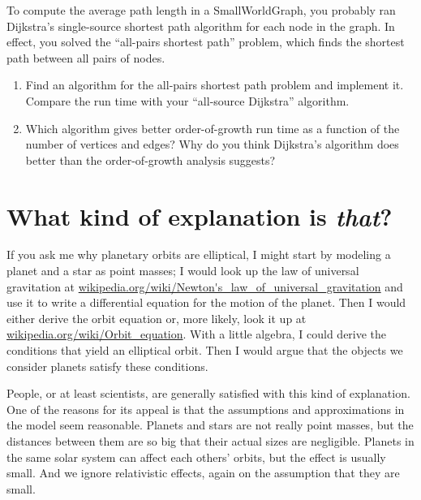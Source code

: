 \documentclass[10pt]{book}
\begin{document}
\begin{exercise}

To compute the average path length in a SmallWorldGraph, you
probably ran Dijkstra's single-source shortest path algorithm
for each node in the graph.  In effect, you solved the
``all-pairs shortest path'' problem, which finds the shortest path
between all pairs of nodes.

\begin{enumerate}

\item Find an algorithm for the all-pairs shortest path problem
and implement it.  Compare the run time with your
``all-source Dijkstra'' algorithm.

\item Which algorithm gives better order-of-growth run time
as a function of the number of vertices and edges?  Why do you
think Dijkstra's algorithm does better than the order-of-growth
analysis suggests?

\end{enumerate}

\end{exercise}


\section{What kind of explanation is {\em that}?}

If you ask me why planetary orbits are elliptical,
I might start by modeling a planet and a star as point masses; I
would look up the law of universal gravitation at
\url{wikipedia.org/wiki/Newton's_law_of_universal_gravitation}
and use it to write a differential equation for the motion of
the planet.  Then I would either derive the orbit equation or,
more likely, look it up at \url{wikipedia.org/wiki/Orbit_equation}.
With a little algebra, I could derive the conditions that
yield an elliptical orbit.  Then I would argue that the objects
we consider planets satisfy these conditions.

People, or at least scientists, are generally satisfied with
this kind of explanation.  One of the reasons for its appeal
is that the assumptions and approximations in the model seem
reasonable.  Planets and stars are not really point masses,
but the distances between them are so big that their actual
sizes are negligible.  Planets in the same solar system can
affect each others' orbits, but the effect is usually small.
And we ignore relativistic effects, again on the assumption that
they are small.
\end{document}
